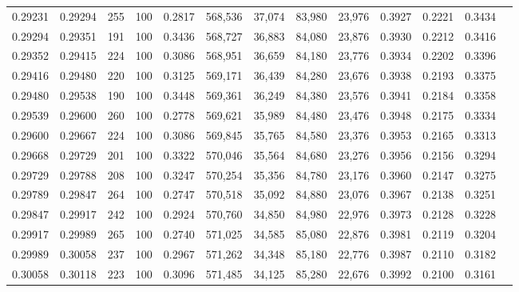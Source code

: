 \begin{tabular}{rrrrrrrrrrrrr}
0.29231 & 0.29294 &   255 & 100 &                                     0.2817 & 568,536 &  37,074 &  83,980 &  23,976 & 0.3927 & 0.2221 & 0.3434 \\
0.29294 & 0.29351 &   191 & 100 &                                     0.3436 & 568,727 &  36,883 &  84,080 &  23,876 & 0.3930 & 0.2212 & 0.3416 \\
0.29352 & 0.29415 &   224 & 100 &                                     0.3086 & 568,951 &  36,659 &  84,180 &  23,776 & 0.3934 & 0.2202 & 0.3396 \\
0.29416 & 0.29480 &   220 & 100 &                                     0.3125 & 569,171 &  36,439 &  84,280 &  23,676 & 0.3938 & 0.2193 & 0.3375 \\
0.29480 & 0.29538 &   190 & 100 &                                     0.3448 & 569,361 &  36,249 &  84,380 &  23,576 & 0.3941 & 0.2184 & 0.3358 \\
0.29539 & 0.29600 &   260 & 100 &                                     0.2778 & 569,621 &  35,989 &  84,480 &  23,476 & 0.3948 & 0.2175 & 0.3334 \\
0.29600 & 0.29667 &   224 & 100 &                                     0.3086 & 569,845 &  35,765 &  84,580 &  23,376 & 0.3953 & 0.2165 & 0.3313 \\
0.29668 & 0.29729 &   201 & 100 &                                     0.3322 & 570,046 &  35,564 &  84,680 &  23,276 & 0.3956 & 0.2156 & 0.3294 \\
0.29729 & 0.29788 &   208 & 100 &                                     0.3247 & 570,254 &  35,356 &  84,780 &  23,176 & 0.3960 & 0.2147 & 0.3275 \\
0.29789 & 0.29847 &   264 & 100 &                                     0.2747 & 570,518 &  35,092 &  84,880 &  23,076 & 0.3967 & 0.2138 & 0.3251 \\
0.29847 & 0.29917 &   242 & 100 &                                     0.2924 & 570,760 &  34,850 &  84,980 &  22,976 & 0.3973 & 0.2128 & 0.3228 \\
0.29917 & 0.29989 &   265 & 100 &                                     0.2740 & 571,025 &  34,585 &  85,080 &  22,876 & 0.3981 & 0.2119 & 0.3204 \\
0.29989 & 0.30058 &   237 & 100 &                                     0.2967 & 571,262 &  34,348 &  85,180 &  22,776 & 0.3987 & 0.2110 & 0.3182 \\
0.30058 & 0.30118 &   223 & 100 &                                     0.3096 & 571,485 &  34,125 &  85,280 &  22,676 & 0.3992 & 0.2100 & 0.3161 \\

\end{tabular}
